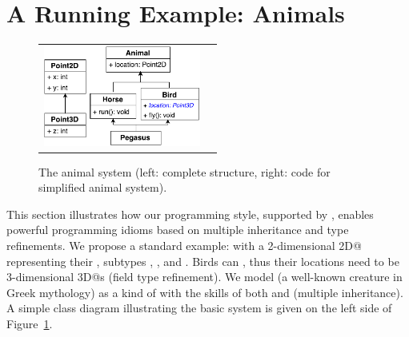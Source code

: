\section{A Running Example: Animals}\label{sec:ep}
\begin{figure}
\centering
\saveSpaceFig
\begin{tabular}{c|c}
\includegraphics[height=3.3cm]{pdfs/PegasusDetail.pdf}\hspace{0pt} &
\begin{minipage}{7cm}
\vspace{-95pt}
\end{minipage}
\end{tabular}
\caption{The animal system (left: complete structure, right: code for simplified animal system).}\label{fig:pegasus}
\saveSpaceFig
\end{figure}

This section illustrates how our programming style, supported by
\mixinAnn{}, enables powerful programming idioms based on multiple
inheritance and type refinements.  We propose a standard example:
\Q@Animal@s with a 2-dimensional \Q@Point2D@ representing their
\Q@location@, subtypes \Q@Horses@, \Q@Bird@s, and \Q@Pegasus@.
Birds can \Q@fly@, thus their locations need to be 3-dimensional
\Q@Point3D@s (field type refinement). We model \Q@Pegasus@
(a well-known creature in Greek mythology) as a kind of
\Q@Animal@ with the skills of both \Q@Horse@s and \Q@Bird@s (multiple
inheritance). A simple class diagram illustrating the basic system is
given on the left side of Figure~\ref{fig:pegasus}.



